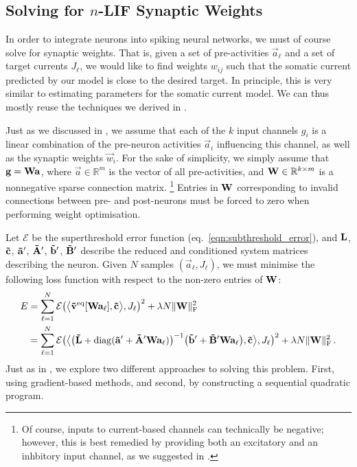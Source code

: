 \subsection{Solving for $n$-LIF Synaptic Weights}
\label{sec:nlif_opt_weights}

In order to integrate \nlif neurons into spiking neural networks, we must of course solve for synaptic weights.
That is, given a set of pre-activities $\vec a_\ell$ and a set of target currents $J_\ell$, we would like to find weights $w_{ij}$ such that the somatic current predicted by our model is close to the desired target.
In principle, this is very similar to estimating parameters for the somatic current model.
We can thus mostly reuse the techniques we derived in .

Just as we discussed in , we assume that each of the $k$ input channels $g_i$ is a linear combination of the pre-neuron activities $\vec a_i$ influencing this channel, as well as the synaptic weights $\vec w_i$.
For the sake of simplicity, we simply assume that $\mathbf{g} = \mathbf{W} \mathbf{a}$, where $\vec a \in \mathbb{R}^m$ is the vector of all pre-activities, and $\mathbf{W} \in \mathbb{R}^{k \times m}$ is a nonnegative sparse connection matrix.%
\footnote{Of course, inputs to current-based channels can technically be negative; however, this is best remedied by providing both an excitatory and an inhbitory input channel, as we suggested in .}
Entries in $\mathbf{W}$ corresponding to invalid connections between pre- and post-neurons must be forced to zero when performing weight optimisation.

Let $\mathcal{E}$ be the superthreshold error function (eq.~\ref{eqn:subthreshold_error}), and $\mathbf{L}$, $\mathbf{\tilde c}$, $\mathbf{\tilde a}'$, $\mathbf{\tilde A}'$, $\mathbf{\tilde b}'$, $\mathbf{\tilde B}'$ describe the reduced and conditioned system matrices describing the neuron.
Given $N$ samples $(\vec a_\ell, J_\ell)$, we must minimise the following loss function with respect to the non-zero entries of $\mathbf{W}$:
\begin{align}
	\begin{aligned}
	E &= \sum_{\ell = 1}^N \mathcal{E}\bigl(
	   	   	\bigl\langle
	   	   		\mathbf{\tilde v}^\mathrm{eq}[\mathbf{W} \mathbf{a}_\ell],
	   	   		\mathbf{\tilde c}
	   	   	\bigr\rangle, J_\ell \bigr)^2  + \lambda N \| \mathbf{W} \|_\mathrm{F}^2 \\
	   &= \sum_{\ell = 1}^N \mathcal{E}\bigl(
	   	\bigl\langle
	   		\bigl(\mathbf{\tilde L} + \operatorname{\mathrm{diag}}(\mathbf{\tilde a}' + \mathbf{\tilde A}' \mathbf{W} \mathbf{a}_\ell) \bigr)^{-1} \bigl(\mathbf{\tilde b}' + \mathbf{\tilde B}' \mathbf{W} \mathbf{a}_\ell \bigr),
	   		\mathbf{\tilde c}
	   	\bigr\rangle, J_\ell \bigr)^2 + \lambda N \| \mathbf{W} \|_\mathrm{F}^2 \,.
	\end{aligned}
	\label{eqn:nlif_weight_opt}	
\end{align}
Just as in , we explore two different approaches to solving this problem.
First, using gradient-based methods, and second, by constructing a sequential quadratic program.

